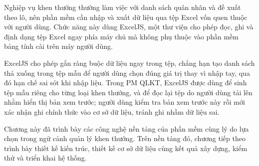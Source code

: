 \documentclass[../DoAn.tex]{subfiles}
\begin{document}
Nghiệp vụ khen thưởng thường làm việc với danh sách quân nhân và đề xuất theo lô, nên phần mềm cần nhập và xuất dữ liệu qua tệp Excel vốn quen thuộc với người dùng. Chức năng này dùng ExcelJS, một thư viện cho phép đọc, ghi và định dạng tệp Excel ngay phía máy chủ mà không phụ thuộc vào phần mềm bảng tính cài trên máy người dùng.

ExcelJS cho phép gắn ràng buộc dữ liệu ngay trong tệp, chẳng hạn tạo danh sách thả xuống trong tệp mẫu để người dùng chọn đúng giá trị thay vì nhập tay, qua đó hạn chế sai sót khi nhập liệu. Trong PM QLKT, ExcelJS được dùng để sinh tệp mẫu riêng cho từng loại khen thưởng, và để đọc lại tệp do người dùng tải lên nhằm hiển thị bản xem trước; người dùng kiểm tra bản xem trước này rồi mới xác nhận ghi chính thức vào cơ sở dữ liệu, tránh ghi nhầm dữ liệu sai.

Chương này đã trình bày các công nghệ nền tảng của phần mềm cùng lý do lựa chọn trong ngữ cảnh quản lý khen thưởng. Trên nền tảng đó, chương tiếp theo trình bày thiết kế kiến trúc, thiết kế cơ sở dữ liệu cùng kết quả xây dựng, kiểm thử và triển khai hệ thống.
\end{document}
